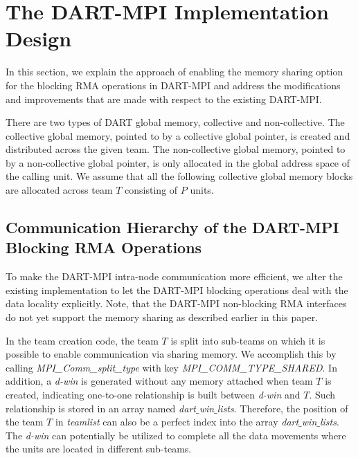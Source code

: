 \documentclass{llncs}
\newcommand{\todo}[1]{}
\begin{document}
{\section {The \mbox{DART-MPI} Implementation Design}
\label{design}

In this section, 
we explain the approach of enabling the memory sharing option for the blocking RMA operations in \mbox{DART-MPI}
and address the modifications and improvements that are made with respect to the existing \mbox{DART-MPI}.

There are two types of DART global memory, collective and non-collective\cite{dart-mpi}.
The collective global memory, pointed to by a collective global pointer, 
is created and distributed across the given team.
The non-collective global memory, pointed to by a non-collective global pointer, 
is only allocated in the global address space of the calling unit.
We assume that all the following collective global memory blocks are
allocated across team $T$ consisting of $P$ units.

\subsection{Communication Hierarchy of the DART-MPI Blocking RMA Operations}
To make the DART-MPI \mbox{intra-node} communication more efficient,
we alter the existing implementation
to let the \mbox{DART-MPI} blocking operations deal with the data locality explicitly.
\todo{Following sentence in discussion?} Note, that the DART-MPI non-blocking RMA interfaces do not yet support the memory sharing as 
described earlier in this paper. 

In the team creation code, 
the team $T$ is split into \mbox{sub-teams} on which it is possible to enable communication via sharing memory. 
We accomplish this by calling {\em MPI\_Comm\_split\_type} with key
{\em MPI\_COMM\_TYPE\_SHARED}. In addition, a \mbox{\textit{d-win}} 
is generated without any memory attached 
when team $T$ is created, indicating \mbox{one-to-one} relationship is built between 
\mbox{\textit{d-win}} and $T$. Such relationship is stored in an array named {\em dart$\_$win$\_$lists}.
Therefore, the position of the team $T$ in \textit{teamlist}\cite{dart-mpi} can also be a perfect index into the 
array {\em dart$\_$win$\_$lists}.
The \mbox{\textit{d-win}} can potentially be utilized to complete
all the data movements where the units are located in different \mbox{sub-teams}.


}
\end{document}

